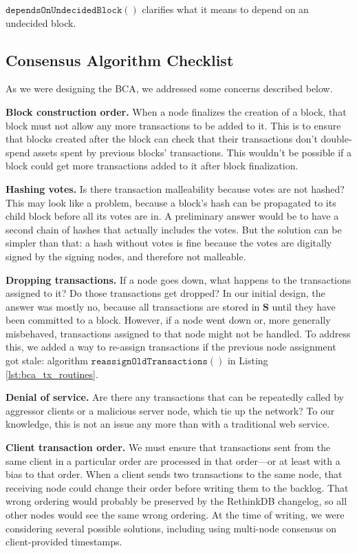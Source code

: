 \medskip
\noindent $\mathtt{dependsOnUndecidedBlock()}$ clarifies what it means to depend on an undecided block.

\subsection{Consensus Algorithm Checklist}
As we were designing the BCA, we addressed some concerns described below.

\medskip
\noindent\textbf{Block construction order.}
When a node finalizes the creation of a block, that block must not allow any more transactions to be added to it. This is to ensure that blocks created after the block can check that their transactions don't double-spend assets spent by previous blocks' transactions. This wouldn't be possible if a block could get more transactions added to it after block finalization.

\medskip
\noindent\textbf{Hashing votes.} 
Is there transaction malleability because votes are not hashed?
This may look like a problem, because a block’s hash can be propagated to its child block before all its votes are in.
A preliminary answer would be to have a second chain of hashes that actually includes the votes.
But the solution can be simpler than that: a hash without votes is fine because the votes are digitally signed by the signing nodes, and therefore not malleable.

\medskip
\noindent\textbf{Dropping transactions.} 
If a node goes down, what happens to the transactions assigned to it? Do those transactions get dropped?
In our initial design, the answer was mostly no, because all transactions are stored in $\mathbf{S}$ until they have been committed to a block.
However, if a node went down or, more generally misbehaved, transactions assigned to that node might not be handled.
To address this, we added a way to re-assign transactions if the previous node assignment got stale: algorithm $\mathtt{reassignOldTransactions()}$ in Listing \ref{lst:bca_tx_routines}.

\medskip
\noindent\textbf{Denial of service.} 
Are there any transactions that can be repeatedly called by aggressor clients or a malicious server node, which tie up the network?
To our knowledge, this is not an issue any more than with a traditional web service.

\medskip
\noindent\textbf{Client transaction order.} 
We must ensure that transactions sent from the same client in a particular order are processed in that order---or at least with a bias to that order.
When a client sends two transactions to the same node, that receiving node could change their order before writing them to the backlog. That wrong ordering would probably be preserved by the RethinkDB changelog, so all other nodes would see the same wrong ordering. At the time of writing, we were considering several possible solutions, including using multi-node consensus on client-provided timestamps.

